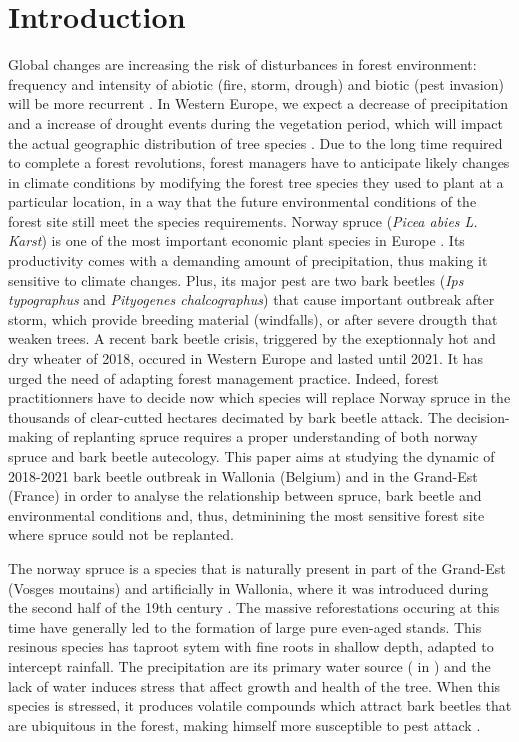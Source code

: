 \documentclass[3p,procedia]{elsarticle}
\begin{document}
\linenumbers

\section{Introduction}

Global changes are increasing the risk of disturbances in forest environment: frequency and intensity of abiotic (fire, storm, drough) and biotic (pest invasion) will be more recurrent \citep{lindner_climate_2010}.
In Western Europe, we expect a decrease of precipitation and a increase of drought events during the vegetation period, which will impact the actual geographic distribution of tree species \citep{hanewinkel2013climate}.
Due to the long time required to complete a forest revolutions, forest managers have to anticipate likely changes in climate conditions by modifying the forest tree species they used to plant at a particular location, in a way that the future environmental conditions of the forest site still meet the species requirements.
Norway spruce (\textit{Picea abies L. Karst}) is one of the most important economic plant species in Europe \citep{nystedt_norway_2013}.
Its productivity comes with a demanding amount of precipitation, thus making it sensitive to climate changes.
Plus, its major pest are two bark beetles (\textit{Ips typographus} and \textit{Pityogenes chalcographus}) that cause important outbreak after storm, which provide breeding material (windfalls), or after severe drougth that weaken trees.
A recent bark beetle crisis, triggered by the exeptionnaly hot and dry wheater of 2018, occured in Western Europe and lasted until 2021. 
It has urged the need of adapting forest management practice. 
Indeed, forest practitionners have to decide now which species will replace Norway spruce in the thousands of clear-cutted hectares decimated by bark beetle attack. 
The decision-making of replanting spruce requires a proper understanding of both norway spruce and bark beetle autecology.
This paper aims at studying the dynamic of 2018-2021 bark beetle outbreak in Wallonia (Belgium) and in the Grand-Est (France) in order to analyse the relationship between spruce, bark beetle and environmental conditions and, thus, detminining the most sensitive forest site where spruce sould not be replanted.


The norway spruce is a species that is naturally present in part of the Grand-Est (Vosges moutains) and artificially in Wallonia, where it was introduced during the second half of the 19th century \citep{Noirfalise_1975}.
The massive reforestations occuring at this time have generally led to the formation of large pure even-aged stands.
This resinous species has taproot sytem with fine roots in shallow depth, adapted to intercept rainfall. 
The precipitation are its primary water source (\cite{weihe_1984} in \cite{tjoeker_biology_nodate}) and the lack of water induces stress that affect growth and health of the tree. 
When this species is stressed, it produces volatile compounds which attract bark beetles that are ubiquitous in the forest, making himself more susceptible to pest attack \citep{netherer_waterlimiting_2015,netherer_interactions_2021}.
\end{document}
